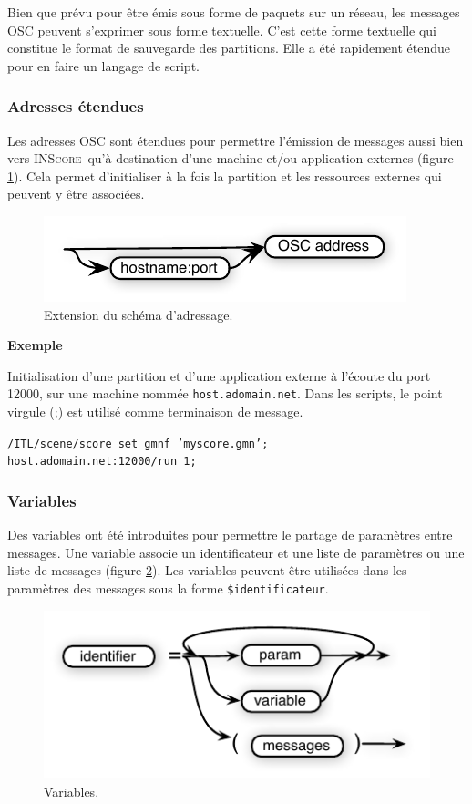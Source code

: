 \documentclass{article}
\newcommand{\inscore}		{\textsc{\small INScore}}
\newcommand{\code}[1]		{\texttt{\small #1}}
\newcommand{\sample}	[1]		{\begin{center}\colorbox{mygrey}{
								\begin{minipage}[t]{0.95\columnwidth} 
								{\small \texttt{#1}}
								\end{minipage}}\end{center}}
\newcounter{excount}
\newcommand{\exemple}			{\vspace{1mm} \hspace*{-4.5mm}\textbf{Exemple \arabic{excount}} \addtocounter{excount}{1}}
\begin{document}
Bien que prévu pour être émis sous forme de paquets sur un réseau, les messages OSC peuvent s'exprimer sous forme textuelle. C'est cette forme textuelle qui constitue le format de sauvegarde des partitions. Elle a été rapidement étendue pour en faire un langage de script.

\subsubsection{Adresses étendues}
Les adresses OSC sont étendues pour permettre l'émission de messages aussi bien vers \inscore\ qu'à destination d'une machine et/ou application externes (figure \ref{fig:eaddr}). Cela permet d'initialiser à la fois la partition et les ressources externes qui peuvent y être associées.

\begin{figure}[htbp]
\centerline{
	\includegraphics[width=0.8\columnwidth]{imgs/extaddress}}
\caption{Extension du schéma d'adressage.}
\label{fig:eaddr}
\end{figure}

\exemple  Initialisation d'une partition et d'une application externe à l'écoute du port 12000, sur une machine nommée \code{host.adomain.net}. Dans les scripts, le point virgule (;) est utilisé comme terminaison de message.
\vspace{-1mm}\sample{/ITL/scene/score set gmnf 'myscore.gmn'; \\
host.adomain.net:12000/run 1; }


\subsubsection{Variables}

Des variables ont été introduites pour permettre le partage de paramètres entre messages. Une variable associe un identificateur et une liste de paramètres ou une liste de messages (figure \ref{fig:var}). Les variables peuvent être utilisées dans les paramètres des messages sous la forme \code{\$identificateur}.

\begin{figure}[htbp]
\centerline{
	\includegraphics[width=0.8\columnwidth]{imgs/variables}}
\caption{Variables.}
\label{fig:var}
\end{figure}
\end{document}
